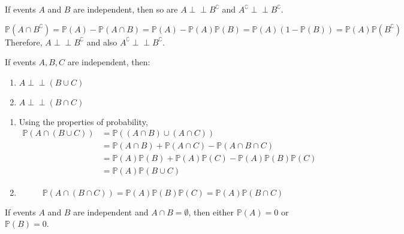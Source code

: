 \documentclass{huhtakm-template-book}
\newcommand{\independent}{\perp\!\!\!\perp}
\newcommand{\prob}{\mathbb{P}}
\begin{document}
    \begin{prop}
        If events $A$ and $B$ are independent, then so are $A\independent B^{\complement}$ and $A^{\complement}\independent B^{\complement}$.
    \end{prop}
    \begin{proofing}
        \begin{equation*}
            \prob(A\cap B^{\complement})=\prob(A)-\prob(A\cap B)=\prob(A)-\prob(A)\prob(B)=\prob(A)(1-\prob(B))=\prob(A)\prob(B^{\complement})
        \end{equation*}
        Therefore, $A\independent B^{\complement}$ and also $A^{\complement}\independent B^{\complement}$.
    \end{proofing}
    \begin{prop}
        If events $A,B,C$ are independent, then:
        \begin{enumerate}
            \item $A\independent(B\cup C)$
            \item $A\independent(B\cap C)$
        \end{enumerate}
    \end{prop}
    \begin{proofing}
        \begin{enumerate}
            \item Using the properties of probability,
            \begin{align*}
                \prob(A\cap(B\cup C))&=\prob((A\cap B)\cup(A\cap C))\\
                &=\prob(A\cap B)+\prob(A\cap C)-\prob(A\cap B\cap C)\\
                &=\prob(A)\prob(B)+\prob(A)\prob(C)-\prob(A)\prob(B)\prob(C)\\
                &=\prob(A)\prob(B\cup C)
            \end{align*}
            \item
            \begin{equation*}
                \prob(A\cap(B\cap C))=\prob(A)\prob(B)\prob(C)=\prob(A)\prob(B\cap C)
            \end{equation*}
        \end{enumerate}
    \end{proofing}
    \begin{rem}
        If events $A$ and $B$ are independent and $A\cap B=\emptyset$, then either $\prob(A)=0$ or $\prob(B)=0$.
    \end{rem}
\end{document}
